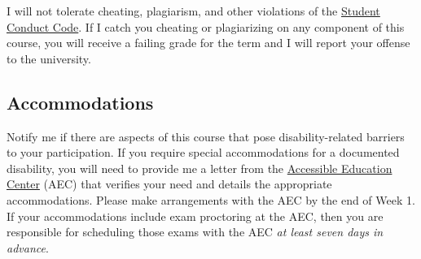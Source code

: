 \documentclass[11pt]{article}
\begin{document}
I will not tolerate cheating, plagiarism, and other violations of the \href{https://studentlife.uoregon.edu/conduct}{Student Conduct Code}. If I catch you cheating or plagiarizing on any component of this course, you will receive a failing grade for the term and I will report your offense to the university. 

\subsection*{Accommodations} 

Notify me if there are aspects of this course that pose disability-related barriers to your participation. If you require special accommodations for a documented disability, you will need to provide me a letter from the \href{https://aec.uoregon.edu/}{Accessible Education Center} (AEC) that verifies your need and details the appropriate accommodations. Please make arrangements with the AEC by the end of Week 1. If your accommodations include exam proctoring at the AEC, then you are responsible for scheduling those exams with the AEC \textit{at least seven days in advance}.

\newpage



\newpage
\end{document}
